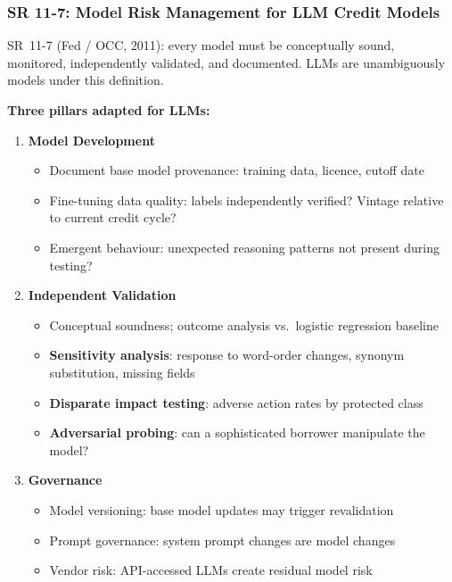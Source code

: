 \documentclass[9pt,t]{beamer}
\begin{document}
\begin{frame}
\frametitle{SR 11-7: Model Risk Management for LLM Credit Models}

SR~11-7 (Fed / OCC, 2011): every model must be conceptually sound, monitored, independently
validated, and documented. LLMs are unambiguously models under this definition.

\medskip
\textbf{Three pillars adapted for LLMs:}

\begin{enumerate}
  \item \textbf{Model Development}
    \begin{itemize}
      \item Document base model provenance: training data, licence, cutoff date
      \item Fine-tuning data quality: labels independently verified? Vintage relative to current credit cycle?
      \item Emergent behaviour: unexpected reasoning patterns not present during testing?
    \end{itemize}

  \item \textbf{Independent Validation}
    \begin{itemize}
      \item Conceptual soundness; outcome analysis vs.\ logistic regression baseline
      \item \textbf{Sensitivity analysis}: response to word-order changes, synonym substitution, missing fields
      \item \textbf{Disparate impact testing}: adverse action rates by protected class
      \item \textbf{Adversarial probing}: can a sophisticated borrower manipulate the model?
    \end{itemize}

  \item \textbf{Governance}
    \begin{itemize}
      \item Model versioning: base model updates may trigger revalidation
      \item Prompt governance: system prompt changes are model changes
      \item Vendor risk: API-accessed LLMs create residual model risk
    \end{itemize}
\end{enumerate}
\end{frame}
\end{document}

